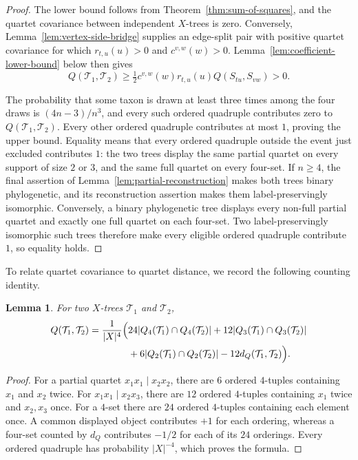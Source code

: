 \documentclass[pdflatex,sn-mathphys-num]{sn-jnl}
\theoremstyle{thmstyleone}
\newtheorem{lemma}{Lemma}
\begin{document}
\begin{proof}
The lower bound follows from Theorem~\ref{thm:sum-of-squares}, and the
quartet covariance between independent $X$-trees is zero.  Conversely,
Lemma~\ref{lem:vertex-side-bridge} supplies an edge-split pair with positive
quartet covariance for
which $r_{t,u}(u)>0$ and $c^{v,w}(w)>0$.
Lemma~\ref{lem:coefficient-lower-bound} below then gives
\[
Q(\mathcal T_1,\mathcal T_2)
\ge\tfrac12c^{v,w}(w)r_{t,u}(u)Q(S_{tu},S_{vw})>0.
\]

The probability that some taxon is drawn at least three times among the four
draws is $(4n-3)/n^3$, and every such ordered quadruple contributes zero to
$Q(\mathcal T_1,\mathcal T_2)$.  Every other ordered
quadruple contributes at most $1$, proving the upper bound.  Equality means
that every ordered quadruple outside the event just excluded contributes $1$:
the two trees display the same
partial quartet on every support of size $2$ or $3$, and the same full
quartet on every four-set.  If $n\ge4$, the final assertion of
Lemma~\ref{lem:partial-reconstruction} makes both trees binary
phylogenetic, and its reconstruction assertion makes them
label-preservingly isomorphic.  Conversely, a binary phylogenetic tree
displays every non-full partial quartet and exactly one full quartet on each
four-set.  Two label-preservingly isomorphic such trees therefore make every
eligible ordered quadruple contribute $1$, so equality holds.
\end{proof}

To relate quartet covariance to quartet distance, we record the following
counting identity.

\begin{lemma}\label{lem:Q-counts}
For two $X$-trees $\mathcal T_1$ and $\mathcal T_2$,
\begin{align*}
Q(\mathcal T_1,\mathcal T_2)
=\frac1{|X|^4}\Bigl(&24|Q_4(\mathcal T_1)\cap Q_4(\mathcal T_2)|
+12|Q_3(\mathcal T_1)\cap Q_3(\mathcal T_2)|\\
&+6|Q_2(\mathcal T_1)\cap Q_2(\mathcal T_2)|
-12d_Q(\mathcal T_1,\mathcal T_2)\Bigr).
\end{align*}
\end{lemma}

\begin{proof}
For a partial quartet $x_1x_1\mid x_2x_2$, there are $6$ ordered
$4$-tuples containing $x_1$ and $x_2$ twice.  For
$x_1x_1\mid x_2x_3$, there are $12$ ordered $4$-tuples containing
$x_1$ twice and $x_2,x_3$ once.  For a $4$-set there are $24$
ordered $4$-tuples containing each element once.  A common displayed object
contributes $+1$ for each ordering, whereas a four-set counted by $d_Q$
contributes $-1/2$ for each of its $24$ orderings.  Every ordered quadruple
has probability $|X|^{-4}$, which proves the formula.
\end{proof}
\end{document}
